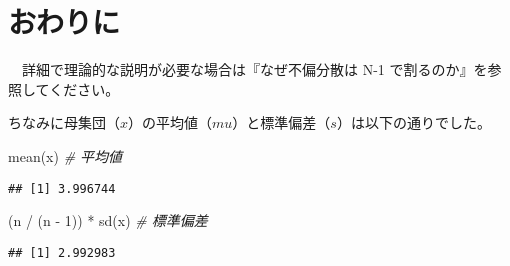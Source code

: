 \documentclass[]{tufte-handout}
\newenvironment{Shaded}{}{}
\newcommand{\CommentTok}[1]{\textcolor[rgb]{0.38,0.63,0.69}{\textit{#1}}}
\newcommand{\DecValTok}[1]{\textcolor[rgb]{0.25,0.63,0.44}{#1}}
\newcommand{\FunctionTok}[1]{\textcolor[rgb]{0.02,0.16,0.49}{#1}}
\newcommand{\NormalTok}[1]{#1}
\newcommand{\SpecialCharTok}[1]{\textcolor[rgb]{0.25,0.44,0.63}{#1}}
\begin{document}
\newpage

\hypertarget{ux304aux308fux308aux306b}{%
\section{\texorpdfstring{\textbf{おわりに}}{おわりに}}\label{ux304aux308fux308aux306b}}

　詳細で理論的な説明が必要な場合は『なぜ不偏分散は N-1
で割るのか』\citep{estpdf82:online}を参照してください。

ちなみに母集団（\(x\)）の平均値（\(mu\)）と標準偏差（\(s\)）は以下の通りでした。

\begin{Shaded}
\begin{Highlighting}[numbers=left,,]
\FunctionTok{mean}\NormalTok{(x)                }\CommentTok{\# 平均値}
\end{Highlighting}
\end{Shaded}

\begin{verbatim}
## [1] 3.996744
\end{verbatim}

\begin{Shaded}
\begin{Highlighting}[numbers=left,,]
\NormalTok{(n }\SpecialCharTok{/}\NormalTok{ (n }\SpecialCharTok{{-}} \DecValTok{1}\NormalTok{)) }\SpecialCharTok{*} \FunctionTok{sd}\NormalTok{(x)  }\CommentTok{\# 標準偏差}
\end{Highlighting}
\end{Shaded}

\begin{verbatim}
## [1] 2.992983
\end{verbatim}

　


\end{document}
